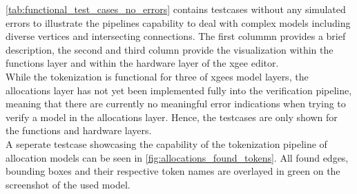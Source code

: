 \autoref{tab:functional_test_cases_no_errors} contains testcases without any simulated errors to illustrate the pipelines capability to deal with complex models including diverse vertices and intersecting connections. The first colummn provides a brief description, the second and third column provide the visualization within the functions layer and within the hardware layer of the \acrshort{xgee} editor.\\
While the tokenization is functional for three of \acrshort{xgee}s model layers, the allocations layer has not yet been implemented fully into the verification pipeline, meaning that there are currently no meaningful error indications when trying to verify a model in the allocations layer. Hence, the testcases are only shown for the functions and hardware layers.\\
A seperate testcase showcasing the capability of the tokenization pipeline of allocation models can be seen in \autoref{fig:allocations_found_tokens}. All found edges, bounding boxes and their respective token names are overlayed in green on the screenshot of the used model.
\newpage
